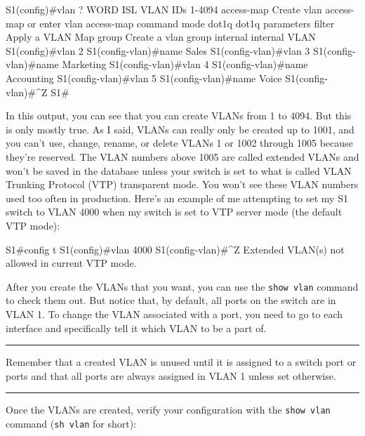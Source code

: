 \documentclass[b5paper,11pt]{memoir}
\begin{document}
\begin{cli}
S1(config)#vlan ?
 WORD        ISL VLAN IDs 1-4094
 access-map  Create vlan access-map or enter vlan access-map command mode
 dot1q       dot1q parameters
 filter      Apply a VLAN Map
 group       Create a vlan group
 internal    internal VLAN
S1(config)#vlan 2
S1(config-vlan)#name Sales
S1(config-vlan)#vlan 3
S1(config-vlan)#name Marketing
S1(config-vlan)#vlan 4
S1(config-vlan)#name Accounting
S1(config-vlan)#vlan 5
S1(config-vlan)#name Voice
S1(config-vlan)#^Z
S1#
\end{cli}

In this output, you can see that you can create VLANs from 1 to 4094.
But this is only mostly true.
As I said, VLANs can really only be created up to 1001, and you can't use, change, rename, or delete VLANs 1
or 1002 through 1005 because they're reserved.
The VLAN numbers above 1005 are called extended VLANs and won't be saved in the database unless your switch is set to what is called VLAN Trunking Protocol (VTP)
transparent mode.
You won't see these VLAN numbers used too often in production.
Here's an example of me attempting to set my S1 switch to VLAN 4000 when my switch is set to VTP server mode (the default VTP mode):

\begin{cli}
S1#config t
S1(config)#vlan 4000
S1(config-vlan)#^Z
Extended VLAN(s) not allowed in current VTP mode.
\end{cli}

After you create the VLANs that you want, you can use the
\texttt{show\ vlan} command to check them out. But notice that, by
default, all ports on the switch are in VLAN 1. To change the VLAN
associated with a port, you need to go to each interface and
specifically tell it which VLAN to be a part of.

\begin{center}\rule{0.5\linewidth}{0.5pt}\end{center}

Remember that a created VLAN is unused
until it is assigned to a switch port or ports and that all ports are
always assigned in VLAN 1 unless set otherwise.

\begin{center}\rule{0.5\linewidth}{0.5pt}\end{center}

Once the VLANs are created, verify your configuration with the
\texttt{show\ vlan} command (\texttt{sh\ vlan} for short):
\end{document}
